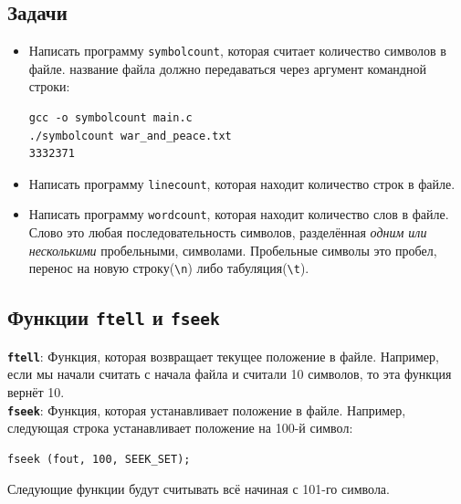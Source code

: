 \documentclass{article}
\begin{document}
\subsection*{Задачи}
\begin{itemize}
\item Написать программу \texttt{symbolcount}, которая считает количество символов в файле. название файла должно передаваться через аргумент командной строки:\\
\begin{verbatim}
gcc -o symbolcount main.c
./symbolcount war_and_peace.txt
3332371
\end{verbatim}
\item Написать программу \texttt{linecount}, которая находит количество строк в файле.
\item Написать программу \texttt{wordcount}, которая находит количество слов в файле. Слово это любая последовательность символов, разделённая \textit{одним или несколькими} пробельными, символами. Пробельные символы это пробел, перенос на новую строку(\texttt{\textbackslash n}) либо табуляция(\texttt{\textbackslash t}).
\end{itemize}


\subsection*{Функции \texttt{ftell} и \texttt{fseek}}

\textbf{\texttt{ftell}}: Функция, которая возвращает текущее положение в файле. Например, если мы начали считать с начала файла и считали 10 символов, то эта функция вернёт 10.\\
\textbf{\texttt{fseek}}: Функция, которая устанавливает положение в файле. Например, следующая строка устанавливает положение на 100-й символ:
\begin{lstlisting}
fseek (fout, 100, SEEK_SET);
\end{lstlisting}
Следующие функции будут считывать всё начиная с 101-го символа.



\newpage
\end{document}
